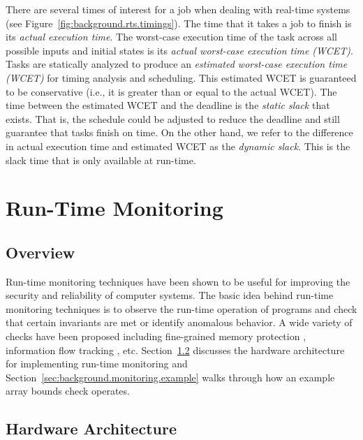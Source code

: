 There are several times of interest for a job when dealing with real-time
systems (see Figure~\ref{fig:background.rts.timings}). The time that it takes a
job to finish is its \emph{actual execution time}. The worst-case execution
time of the task across all possible inputs and initial states is its
\emph{actual worst-case execution time (WCET)}. Tasks are statically analyzed
to produce an \emph{estimated worst-case execution time (WCET)} for timing
analysis and scheduling. This estimated WCET is guaranteed to be conservative
(i.e., it is greater than or equal to the actual WCET).  The time between the
estimated WCET and the deadline is the \emph{static slack} that exists. That
is, the schedule could be adjusted to reduce the deadline and still guarantee
that tasks finish on time. On the other hand, we refer to the difference in
actual execution time and estimated WCET as the \emph{dynamic slack}. This is
the slack time that is only available at run-time.

\section{Run-Time Monitoring}
\label{sec:background.monitoring}

\subsection{Overview}

Run-time monitoring techniques have been shown to be useful for improving the
security and reliability of computer systems. The basic idea behind run-time
monitoring techniques is to observe the run-time operation of programs and
check that certain invariants are met or identify anomalous behavior. A wide
variety of checks have been proposed including fine-grained memory protection
\cite{mondrian-asplos02}, information flow tracking \cite{dift-asplos04,
testudo-micro08}, etc. Section~\ref{sec:background.monitoring.arch} discusses
the hardware architecture for implementing run-time monitoring and
Section~\ref{sec:background.monitoring.example} walks through how an example
array bounds check operates.

\subsection{Hardware Architecture}
\label{sec:background.monitoring.arch}

